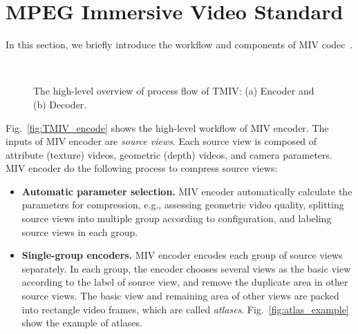 \section{MPEG Immersive Video Standard}\label{sec:TMIV}

In this section, we briefly introduce the workflow and components of MIV codec~\cite{tmiv_doc,BDDF+21}.

\begin{figure}[tbh]
    \centering
    \\
    \caption{The high-level overview of process flow of TMIV: (a) Encoder and (b) Decoder.}
    \label{fig:TMIV_codec}
\end{figure}

Fig.~\ref{fig:TMIV_encode} shows the high-level workflow of MIV encoder. The inputs of MIV encoder are {\em source views}. Each source view is composed of attribute (texture) videos, geometric (depth) videos, and camera parameters. MIV encoder do the following process to compress source views:
\begin{itemize}
    \item {\bf Automatic parameter selection.} MIV encoder automatically calculate the parameters for compression, e.g., assessing geometric video quality, splitting source views into multiple group according to configuration, and labeling source views in each group.
    \item {\bf Single-group encoders.} MIV encoder encodes each group of source views separately. In each group, 
    the encoder chooses several views as the basic view according to the label of source view, and remove the duplicate area in other source views. The basic view and remaining area of other views are packed into rectangle video frames, which are called {\em atlases}. Fig.~\ref{fig:atlas_example} show the example of atlases. 
\end{itemize}

